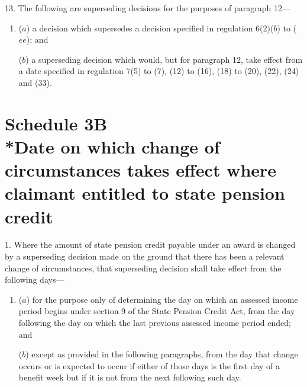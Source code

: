\documentclass[12pt,a4paper]{article}
\begin{document}
\medskip

13.  The following are superseding decisions for the purposes of paragraph 12—
\begin{enumerate}\item[]
($a$) a decision which supersedes a decision specified in regulation 6(2)($b$)  to ($ee$); and

($b$) a superseding decision which would, but for paragraph 12, take effect from a date specified in regulation 7(5) to (7), (12) to (16), (18) to (20), (22), (24) and (33).
\end{enumerate}



\part[Schedule 3B --- Date on which change of circumstances takes effect where claimant entitled to state pension credit]{Schedule 3B\\*Date on which change of circumstances takes effect where claimant entitled to state pension credit}

\renewcommand\parthead{--- Schedule 3B}


\medskip

1.  Where the amount of state pension credit payable under an award is changed by a superseding decision made on the ground that there has been a relevant change of circumstances, that superseding decision shall take effect from the following days—
\begin{enumerate}\item[]
($a$) for the purpose only of determining the day on which an assessed income period begins under section 9 of the State Pension Credit Act, from the day following the day on which the last previous assessed income period ended; and

($b$) except as provided in the following paragraphs, from the day that change occurs or is expected to occur if either of those days is the first day of a benefit week but if it is not from the next following such day.
\end{enumerate}
\end{document}

